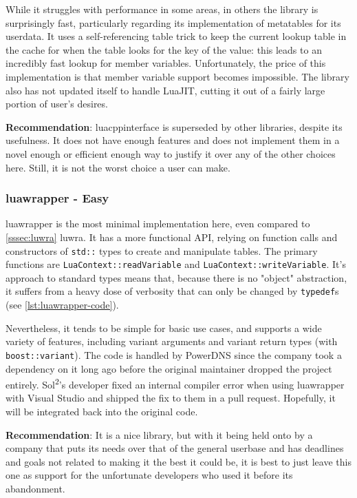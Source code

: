 \documentclass[conference,compsoc]{IEEEtran}
\newcommand{\soltwo}{Sol\textsuperscript{2}}
\begin{document}
While it struggles with performance in some areas, in others the library is surprisingly fast, particularly regarding its implementation of metatables for its userdata. It uses a self-referencing table trick to keep the current lookup table in the cache for when the table looks for the key of the value: this leads to an incredibly fast lookup for member variables. Unfortunately, the price of this implementation is that member variable support becomes impossible. The library also has not updated itself to handle LuaJIT, cutting it out of a fairly large portion of user's desires.

\textbf{Recommendation}: luacppinterface is superseded by other libraries, despite its usefulness. It does not have enough features and does not implement them in a novel enough or efficient enough way to justify it over any of the other choices here. Still, it is not the worst choice a user can make.

\subsubsection{luawrapper - Easy}

luawrapper\cite{luawrapper} is the most minimal implementation here, even compared to \cref{sssec:luwra} luwra. It has a more functional API, relying on function calls and constructors of \lstinline|std::| types to create and manipulate tables. The primary functions are \lstinline|LuaContext::readVariable| and \lstinline|LuaContext::writeVariable|. It's approach to standard types means that, because there is no "object" abstraction, it suffers from a heavy dose of verbosity that can only be changed by \lstinline|typedef|s (see \cref{lst:luawrapper-code}).

Nevertheless, it tends to be simple for basic use cases, and supports a wide variety of features, including variant arguments and variant return types (with \lstinline|boost::variant|).  The code is handled by PowerDNS since the company took a dependency on it long ago before the original maintainer dropped the project entirely. \soltwo{}'s developer fixed an internal compiler error when using luawrapper with Visual Studio and shipped the fix to them in a pull request. Hopefully, it will be integrated back into the original code.

\textbf{Recommendation}: It is a nice library, but with it being held onto by a company that puts its needs over that of the general userbase and has deadlines and goals not related to making it the best it could be, it is best to just leave this one as support for the unfortunate developers who used it before its abandonment.
\end{document}
